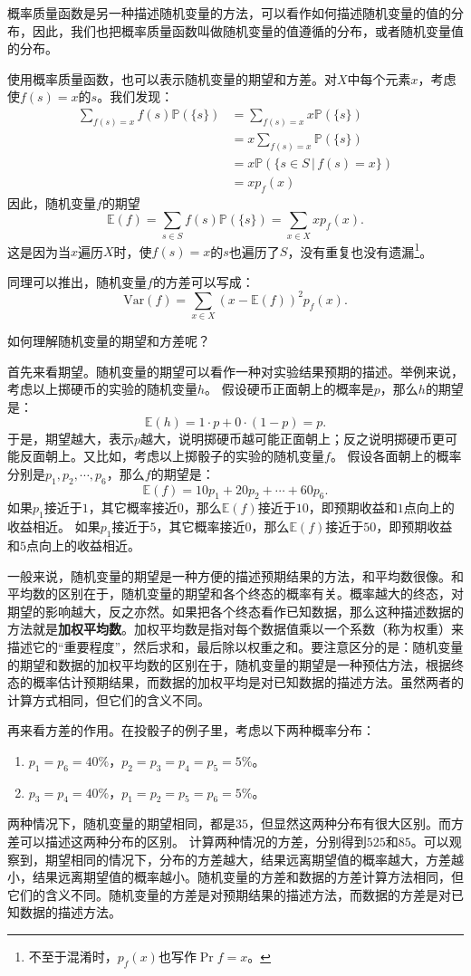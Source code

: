 \documentclass[12pt,UTF8,fontset=none]{ctexbook}
\begin{document}
概率质量函数是另一种描述随机变量的方法，可以看作如何描述随机变量的值的分布，因此，我们也把概率质量函数叫做随机变量的值遵循的分布，或者随机变量值的分布。

使用概率质量函数，也可以表示随机变量的期望和方差。对$X$中每个元素$x$，考虑使$f(s) = x$的$s$。我们发现：
\begin{align*}
    \sum_{f(s) = x} f(s) \mathbb{P}(\{s\}) &= \sum_{f(s) = x} x \mathbb{P}(\{s\})  \\
    &= x \sum_{f(s) = x} \mathbb{P}(\{s\})  \\
    &= x \mathbb{P}(\{s \in S \,|\, f(s) = x\})  \\
    &= x p_f(x)   
\end{align*}
因此，随机变量$f$的期望
$$ \mathbb{E}(f) = \sum_{s\in S} f(s) \mathbb{P}(\{s\}) = \sum_{x \in X} x p_f(x). $$
这是因为当$x$遍历$X$时，使$f(s) = x$的$s$也遍历了$S$，没有重复也没有遗漏\footnote{不至于混淆时，\(p_f(x)\)也写作\(\Pr{f=x}\)。}。

同理可以推出，随机变量$f$的方差可以写成：
$$ \mathrm{Var}(f)  = \sum_{x\in X} \left(x - \mathbb{E}(f)\right)^2 p_f(x).$$ 

如何理解随机变量的期望和方差呢？

首先来看期望。随机变量的期望可以看作一种对实验结果预期的描述。举例来说，考虑以上掷硬币的实验的随机变量$h$。
假设硬币正面朝上的概率是$p$，那么$h$的期望是：
$$ \mathbb{E}(h) = 1\cdot p + 0\cdot (1 - p) = p. $$
于是，期望越大，表示$p$越大，说明掷硬币越可能正面朝上；反之说明掷硬币更可能反面朝上。又比如，考虑以上掷骰子的实验的随机变量$f$。
假设各面朝上的概率分别是$p_1, p_2, \cdots , p_6$，那么$f$的期望是：
$$ \mathbb{E}(f) = 10p_1 + 20p_2 + \cdots + 60p_6. $$
如果$p_1$接近于$1$，其它概率接近$0$，那么$\mathbb{E}(f)$接近于$10$，即预期收益和$1$点向上的收益相近。
如果$p_1$接近于$5$，其它概率接近$0$，那么$\mathbb{E}(f)$接近于$50$，即预期收益和$5$点向上的收益相近。

一般来说，随机变量的期望是一种方便的描述预期结果的方法，和平均数很像。和平均数的区别在于，随机变量的期望和各个终态的概率有关。概率越大的终态，对期望的影响越大，反之亦然。如果把各个终态看作已知数据，那么这种描述数据的方法就是\textbf{加权平均数}。加权平均数是指对每个数据值乘以一个系数（称为权重）来描述它的“重要程度”，然后求和，最后除以权重之和。要注意区分的是：随机变量的期望和数据的加权平均数的区别在于，随机变量的期望是一种预估方法，根据终态的概率估计预期结果，而数据的加权平均是对已知数据的描述方法。虽然两者的计算方式相同，但它们的含义不同。

再来看方差的作用。在投骰子的例子里，考虑以下两种概率分布：
\begin{enumerate}
    \item $p_1 = p_6 = 40\%$，$p_2 = p_3 = p_4 = p_5 = 5\%$。
    \item $p_3 = p_4 = 40\%$，$p_1 = p_2 = p_5 = p_6 = 5\%$。
\end{enumerate}
两种情况下，随机变量的期望相同，都是$35$，但显然这两种分布有很大区别。而方差可以描述这两种分布的区别。
计算两种情况的方差，分别得到$525$和$85$。可以观察到，期望相同的情况下，分布的方差越大，结果远离期望值的概率越大，方差越小，结果远离期望值的概率越小。随机变量的方差和数据的方差计算方法相同，但它们的含义不同。随机变量的方差是对预期结果的描述方法，而数据的方差是对已知数据的描述方法。
\end{document}

